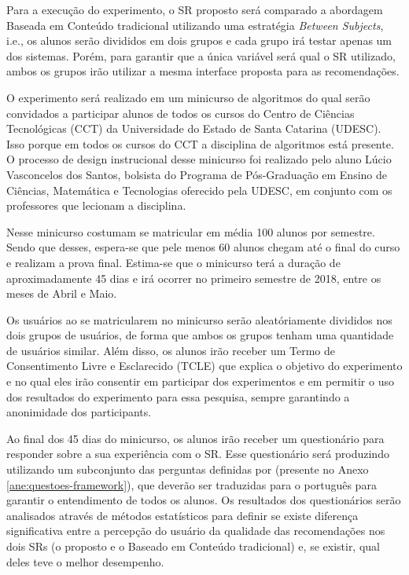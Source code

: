 Para a execução do experimento, o SR proposto será comparado a abordagem Baseada em Conteúdo tradicional utilizando uma
estratégia \textit{Between Subjects}, i.e., os alunos serão divididos em dois grupos e cada grupo irá testar apenas
um dos sistemas. Porém, para garantir que a única variável será qual o SR utilizado, ambos os grupos irão utilizar a mesma
interface proposta para as recomendações.

O experimento será realizado em um minicurso de algoritmos do qual serão convidados a participar alunos de todos os cursos do Centro de
Ciências Tecnológicas (CCT) da Universidade do Estado de Santa Catarina (UDESC). Isso porque em todos os cursos do CCT
a disciplina de algoritmos está presente. O processo de design instrucional desse minicurso foi realizado pelo aluno
Lúcio Vasconcelos dos Santos, bolsista do Programa de Pós-Graduação em Ensino de Ciências, Matemática e Tecnologias
oferecido pela UDESC, em conjunto com os professores que lecionam a disciplina.

Nesse minicurso costumam se matricular em média 100 alunos por semestre. Sendo que desses, espera-se que pele menos 60 alunos chegam até
o final do curso e realizam a prova final. Estima-se que o minicurso terá a duração de aproximadamente 45 dias e irá ocorrer no primeiro semestre
de 2018, entre os meses de Abril e Maio.

Os usuários ao se matricularem no minicurso serão aleatóriamente divididos nos dois grupos de usuários, de forma que ambos
os grupos tenham uma quantidade de usuários similar. Além disso, os alunos irão receber um Termo de Consentimento Livre
e Esclarecido (TCLE) que explica o objetivo do experimento e no qual eles irão consentir em participar dos experimentos e
em permitir o uso dos resultados do experimento para essa pesquisa, sempre garantindo a anonimidade dos participants.

Ao final dos 45 dias do minicurso, os alunos irão receber um questionário para responder sobre a sua experiência com o SR.
Esse questionário será produzindo utilizando um subconjunto das perguntas definidas por  (presente no
Anexo \ref{ane:questoes-framework}), que deverão ser traduzidas para o português para garantir o entendimento de todos os alunos.
Os resultados dos questionários serão  analisados através de métodos estatísticos para definir se existe diferença
significativa entre a percepção do usuário da qualidade das recomendações nos dois SRs (o proposto e o Baseado em Conteúdo tradicional) e, se existir,
qual deles teve o melhor desempenho.


